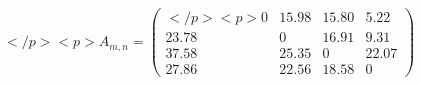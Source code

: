 \documentclass[12pt]{article}
\begin{document}
$ \begin{equation*}</p>
<p>    A_{m,n} =     \begin{pmatrix}</p>
<p>0 &15.98 & 15.80& 5.22\\ 23.78 & 0 &16.91 & 9.31 \\ 37.58 & 25.35 & 0 & 22.07 \\ 27.86 & 22.56 & 18.58 & 0    \end{pmatrix}\end{equation*} $
\end{document}
